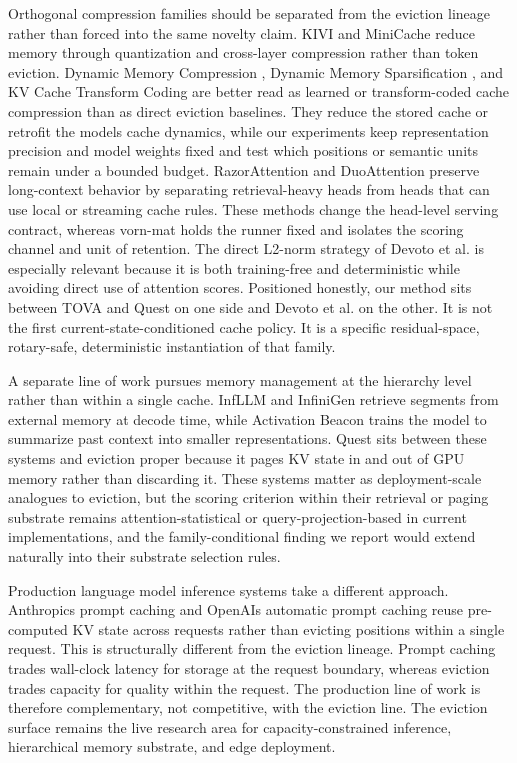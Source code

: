 \documentclass[
]{article}
\begin{document}
Orthogonal compression families should be separated from the eviction
lineage rather than forced into the same novelty claim. KIVI
\citep{liu2024kivi} and MiniCache
\citep{liu2024minicache} reduce memory through
quantization and cross-layer compression rather than token eviction.
Dynamic Memory Compression
\citep{nawrot2024dynamicmemorycompression}, Dynamic
Memory Sparsification \citep{lancucki2025hyperscaling},
and KV Cache Transform Coding
\citep{staniszewski2025kvtc} are better read as learned
or transform-coded cache compression than as direct eviction baselines.
They reduce the stored cache or retrofit the model\textquotesingle s
cache dynamics, while our experiments keep representation precision and
model weights fixed and test which positions or semantic units remain
under a bounded budget. RazorAttention
\citep{tang2024razorattention} and DuoAttention
\citep{xiao2024duoattention} preserve long-context
behavior by separating retrieval-heavy heads from heads that can use
local or streaming cache rules. These methods change the head-level
serving contract, whereas vorn-mat holds the runner fixed and isolates
the scoring channel and unit of retention. The direct L2-norm strategy
of Devoto et al. \citep{devoto2024l2norm} is especially
relevant because it is both training-free and deterministic while
avoiding direct use of attention scores. Positioned honestly, our method
sits between TOVA and Quest on one side and Devoto et al. on the other.
It is not the first current-state-conditioned cache policy. It is a
specific residual-space, rotary-safe, deterministic instantiation of
that family.

A separate line of work pursues memory management at the hierarchy level
rather than within a single cache. InfLLM
\citep{xiao2024infllm} and InfiniGen
\citep{lee2024infinigen} retrieve segments from external
memory at decode time, while Activation Beacon
\citep{zhang2024activationbeacon} trains the model to
summarize past context into smaller representations. Quest
\citep{tang2024quest} sits between these systems and
eviction proper because it pages KV state in and out of GPU memory
rather than discarding it. These systems matter as deployment-scale
analogues to eviction, but the scoring criterion within their retrieval
or paging substrate remains attention-statistical or
query-projection-based in current implementations, and the
family-conditional finding we report would extend naturally into their
substrate selection rules.

Production language model inference systems take a different approach.
Anthropic\textquotesingle s prompt caching \citep{anthropic2024promptcaching} and
OpenAI\textquotesingle s automatic prompt caching \citep{openai2024promptcaching} reuse
pre-computed KV state across requests rather than evicting positions
within a single request. This is structurally different from the
eviction lineage. Prompt caching trades wall-clock latency for storage
at the request boundary, whereas eviction trades capacity for quality
within the request. The production line of work is therefore
complementary, not competitive, with the eviction line. The eviction
surface remains the live research area for capacity-constrained
inference, hierarchical memory substrate, and edge deployment.
\end{document}
